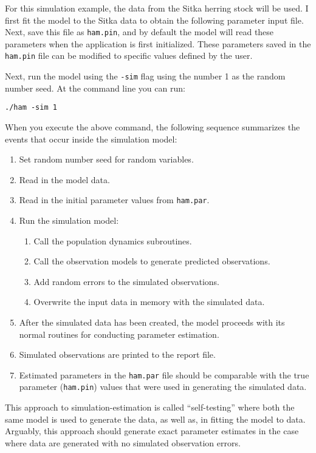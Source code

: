 \documentclass[12pt,letterpaper]{article}
\begin{document}
  For this simulation example, the data from the Sitka herring stock will be used. I first fit the model to the Sitka data to obtain the following parameter input file. Next, save this file as \texttt{ham.pin}, and by default the model will read these parameters when the application is first initialized. These parameters saved in the \texttt{ham.pin} file can be modified to specific values defined by the user.  

  

  Next, run the model using the \texttt{-sim} flag using the number 1 as the random number seed.  At the command line you can run:

  \texttt{./ham -sim 1}

  When you execute the above command, the following sequence summarizes the events that occur inside the simulation model:
  \begin{enumerate}
    \item Set random number seed for random variables.
    \item Read in the model data.
    \item Read in the initial parameter values from \texttt{ham.par}.
      \item Run the simulation model:
    \begin{enumerate}
    \item Call the population dynamics subroutines.
    \item Call the observation models to generate predicted observations.
    \item Add random errors to the simulated observations.
    \item Overwrite the input data in memory with the simulated data.
    \end{enumerate}
    \item After the simulated data has been created, the model proceeds with its normal routines for conducting parameter estimation.
    \item Simulated observations are printed to the report file. 
    \item Estimated parameters in the \texttt{ham.par} file should be comparable with the true parameter (\texttt{ham.pin}) values that were used in generating the simulated data.
  \end{enumerate}

  This approach to simulation-estimation is called ``self-testing'' where both the same model is used to generate the data, as well as, in fitting the model to data. Arguably, this approach should generate exact parameter estimates in the case where data are generated with no simulated observation errors.
\end{document}

